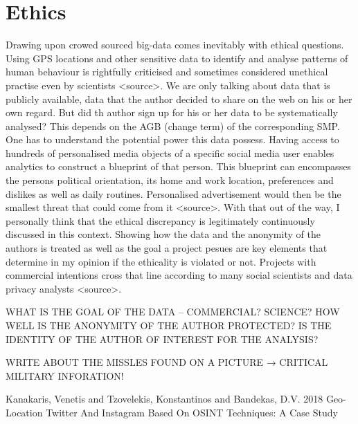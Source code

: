 \chapter{Ethics}

Drawing upon crowed sourced big-data comes inevitably with ethical questions. Using GPS locations and other sensitive data to identify and analyse patterns of human behaviour is rightfully criticised and sometimes considered unethical practise even by scientists <source>.
We are only talking about data that is publicly available, data that the author decided to share on the web on his or her own regard. But did th author sign up for his or her data to be systematically analysed? This depends on the AGB (change term) of the corresponding SMP.
One has to understand the potential power this data possess. Having access to hundreds of personalised media objects of a specific social media user enables analytics to construct a blueprint of that person. This blueprint can encompasses the persons political orientation, its  home and work location, preferences and dislikes as well as daily routines. Personalised advertisement would then be the smallest threat that could come from it <source>.
With that out of the way, I personally think that the ethical discrepancy is legitimately continuously discussed in this context. Showing how the data and the anonymity of the authors is treated as well as the goal a project pesues are key elements that determine in my opinion if the ethicality is violated or not. Projects with commercial intentions cross that line according to many social scientists and data privacy analysts <source>. 

WHAT IS THE GOAL OF THE DATA – COMMERCIAL? SCIENCE?
HOW WELL IS THE ANONYMITY OF THE AUTHOR PROTECTED?
IS THE IDENTITY OF THE AUTHOR OF INTEREST FOR THE ANALYSIS?

WRITE ABOUT THE MISSLES FOUND ON A PICTURE → CRITICAL MILITARY INFORATION!

Kanakaris, Venetis and Tzovelekis, Konstantinos and Bandekas, D.V. 2018
Geo-Location Twitter And Instagram Based On OSINT Techniques: A Case Study

